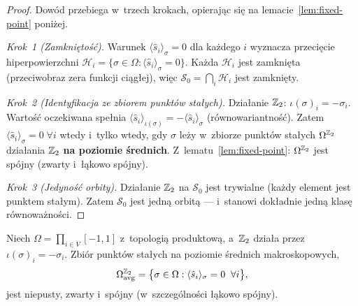 \begin{proof}
Dow\'od przebiega w~trzech krokach, opieraj\k{a}c si\k{e}
na lemacie~\ref{lem:fixed-point} poni\.zej.

\emph{Krok~1 (Zamkni\k{e}to\'s\'c).}
Warunek $\langle\hat{s}_i\rangle_\sigma = 0$ dla ka\.zdego $i$
wyznacza przeci\k{e}cie hiperpowierzchni
$\mathcal{H}_i = \{\sigma\in\Omega : \langle\hat{s}_i\rangle_\sigma=0\}$.
Ka\.zda $\mathcal{H}_i$ jest zamkni\k{e}ta (przeciwobraz zera
funkcji ci\k{a}g\l{}ej), wi\k{e}c
$\mathcal{S}_0 = \bigcap_i \mathcal{H}_i$ jest zamkni\k{e}ty.

\emph{Krok~2 (Identyfikacja ze zbiorem punkt\'ow sta\l{}ych).}
Dzia\l{}anie $\mathbb{Z}_2$: $\iota(\sigma)_i = -\sigma_i$.
Warto\'s\'c oczekiwana spe\l{}nia $\langle\hat{s}_i\rangle_{\iota(\sigma)}
= -\langle\hat{s}_i\rangle_\sigma$ (r\'ownowariantno\'s\'c).
Zatem $\langle\hat{s}_i\rangle_\sigma = 0\;\forall i$ wtedy
i~tylko wtedy, gdy $\sigma$ le\.zy w~zbiorze punkt\'ow sta\l{}ych
$\Omega^{\mathbb{Z}_2}$ dzia\l{}ania $\mathbb{Z}_2$ \textbf{na poziomie \'srednich}.
Z~lematu~\ref{lem:fixed-point}:
$\Omega^{\mathbb{Z}_2}$ jest sp\'ojny (zwarty i~\l{}\k{a}kowo sp\'ojny).

\emph{Krok~3 (Jedyno\'s\'c orbity).}
Dzia\l{}anie $\mathbb{Z}_2$ na $\mathcal{S}_0$ jest trywialne
(ka\.zdy element jest punktem sta\l{}ym). Zatem
$\mathcal{S}_0$ jest jedn\k{a} orbit\k{a} --- i~stanowi
dok\l{}adnie jedn\k{a} klas\k{e} r\'ownowa\.zno\'sci.
\end{proof}

\begin{lemma}%
\label{lem:fixed-point}
Niech $\Omega = \prod_{i\in V} [-1,1]$ z~topologi\k{a} produktow\k{a},
a~$\mathbb{Z}_2$ dzia\l{}a przez $\iota(\sigma)_i = -\sigma_i$.
Zbi\'or punkt\'ow sta\l{}ych na poziomie \'srednich makroskopowych,
\[
  \Omega^{\mathbb{Z}_2}_{\mathrm{avg}}
  = \bigl\{\sigma\in\Omega :
    \langle\hat{s}_i\rangle_\sigma = 0\;\;\forall i\bigr\},
\]
jest niepusty, zwarty i~sp\'ojny (w~szczeg\'olno\'sci
\l{}\k{a}kowo sp\'ojny).
\end{lemma}

